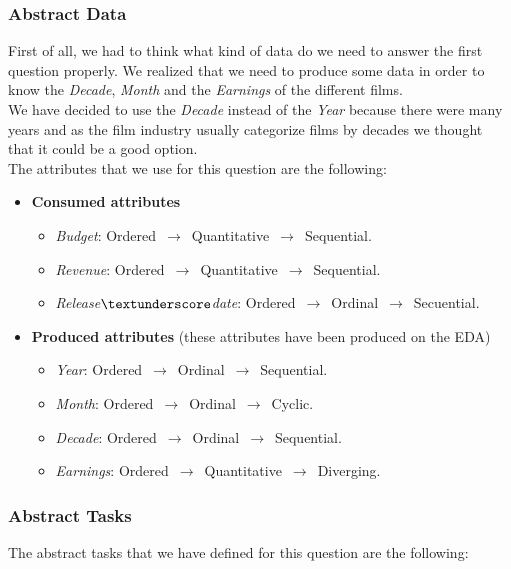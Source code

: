 \subsubsection{Abstract Data}

First of all, we had to think what kind of data do we need to answer the first question properly. We realized that we need to produce some data in order to know the \textit{Decade}, \textit{Month} and the \textit{Earnings} of the different films.\\

We have decided to use the \textit{Decade} instead of the \textit{Year} because there were many years and as the film industry usually categorize films by decades we thought that it could be a good option.\\

The attributes that we use for this question are the following:

\begin{itemize}
	\item \textbf{Consumed attributes}
		\begin{itemize}
			\item \textit{Budget}: Ordered $\,\to\,$ Quantitative $\,\to\,$ Sequential.
			\item \textit{Revenue}: Ordered $\,\to\,$ Quantitative $\,\to\,$ Sequential.
			\item \textit{Release$\textunderscore$date}: Ordered $\,\to\,$ Ordinal $\,\to\,$ Secuential.
		\end{itemize}
	\item \textbf{Produced attributes} (these attributes have been produced on the EDA)
		\begin{itemize}
			\item \textit{Year}: Ordered $\,\to\,$ Ordinal $\,\to\,$ Sequential.
			\item \textit{Month}: Ordered $\,\to\,$ Ordinal $\,\to\,$ Cyclic.
			\item \textit{Decade}: Ordered $\,\to\,$ Ordinal $\,\to\,$ Sequential.
			\item \textit{Earnings}: Ordered $\,\to\,$ Quantitative $\,\to\,$ Diverging.
		\end{itemize}
\end{itemize}

\subsubsection{Abstract Tasks}

The abstract tasks that we have defined for this question are the following:

